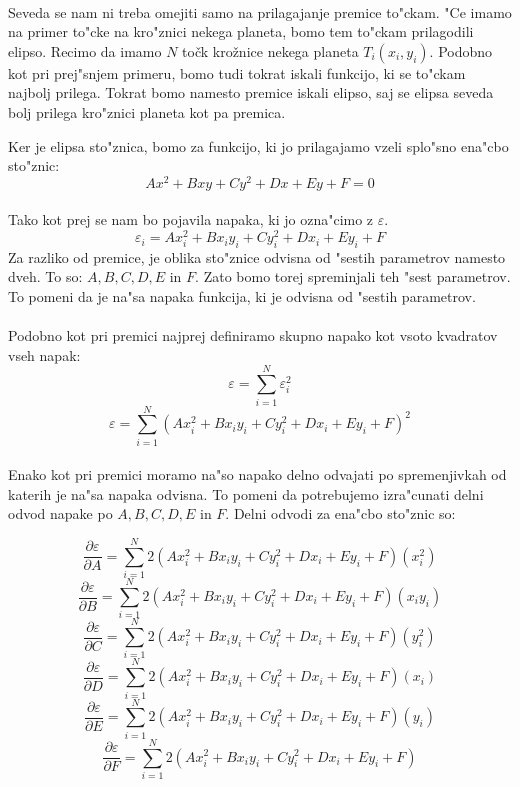 \paragraph{}
Seveda se nam ni treba omejiti samo na prilagajanje premice to"ckam. "Ce imamo na primer to"cke na kro"znici nekega planeta, bomo tem to"ckam prilagodili elipso. Recimo da imamo $N$ točk krožnice nekega planeta $T_i(x_i, y_i)$. Podobno kot pri prej"snjem primeru, bomo tudi tokrat iskali funkcijo, ki se to"ckam najbolj prilega. Tokrat bomo namesto premice iskali elipso, saj se elipsa seveda bolj prilega kro"znici planeta kot pa premica.

Ker je elipsa sto"znica, bomo za funkcijo, ki jo prilagajamo vzeli splo"sno ena"cbo sto"znic:
$$Ax^2 + Bxy + Cy^2 + Dx + Ey + F = 0$$

\paragraph{}
Tako kot prej se nam bo pojavila napaka, ki jo ozna"cimo z $\varepsilon$.
$$\varepsilon_i = Ax_i^2 + Bx_iy_i + Cy_i^2 + Dx_i + Ey_i + F$$
Za razliko od premice, je oblika sto"znice odvisna od "sestih parametrov namesto dveh. To so: $A, B, C, D, E$ in $F$. Zato bomo torej spreminjali teh "sest parametrov. To pomeni da je na"sa napaka funkcija, ki je odvisna od "sestih parametrov.

\paragraph{}
Podobno kot pri premici najprej definiramo skupno napako kot vsoto kvadratov vseh napak:
\[\varepsilon = \sum_{i=1}^{N}\varepsilon_i^2\]
\[\varepsilon = \sum_{i=1}^{N} (Ax_i^2 + Bx_iy_i + Cy_i^2 + Dx_i + Ey_i + F)^2\]

\paragraph{}
Enako kot pri premici moramo na"so napako delno odvajati po spremenjivkah od katerih je na"sa napaka odvisna. To pomeni da potrebujemo izra"cunati delni odvod napake po $A, B, C, D, E$ in $F$. Delni odvodi za ena"cbo sto"znic so:

$$\frac{\partial \varepsilon}{\partial A} = \sum_{i=1}^{N}2(Ax_i^2 + Bx_iy_i + Cy_i^2 + Dx_i + Ey_i + F)(x_i^2)$$
$$\frac{\partial \varepsilon}{\partial B} = \sum_{i=1}^{N}2(Ax_i^2 + Bx_iy_i + Cy_i^2 + Dx_i + Ey_i + F)(x_iy_i)$$
$$\frac{\partial \varepsilon}{\partial C} = \sum_{i=1}^{N}2(Ax_i^2 + Bx_iy_i + Cy_i^2 + Dx_i + Ey_i + F)(y_i^2)$$
$$\frac{\partial \varepsilon}{\partial D} = \sum_{i=1}^{N}2(Ax_i^2 + Bx_iy_i + Cy_i^2 + Dx_i + Ey_i + F)(x_i)$$
$$\frac{\partial \varepsilon}{\partial E} = \sum_{i=1}^{N}2(Ax_i^2 + Bx_iy_i + Cy_i^2 + Dx_i + Ey_i + F)(y_i)$$
$$\frac{\partial \varepsilon}{\partial F} = \sum_{i=1}^{N}2(Ax_i^2 + Bx_iy_i + Cy_i^2 + Dx_i + Ey_i + F)$$

